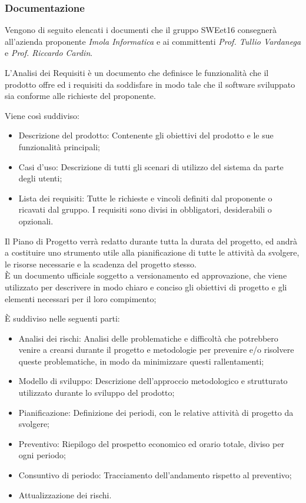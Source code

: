 \subsubsection{Documentazione}

Vengono di seguito elencati i documenti che il gruppo SWEet16 consegnerà all'azienda proponente \textit{Imola Informatica} e ai committenti \textit{Prof. Tullio Vardanega} e \textit{Prof. Riccardo Cardin}.



    L'Analisi dei Requisiti è un documento che definisce le funzionalità che il prodotto offre ed i requisiti da soddisfare in modo tale che il software sviluppato sia conforme alle richieste del proponente.

    Viene così suddiviso:
    \begin{itemize}
        \item Descrizione del prodotto: Contenente gli obiettivi del prodotto e le sue funzionalità principali;
        \item Casi d'uso: Descrizione di tutti gli scenari di utilizzo del sistema da parte degli utenti;
        \item Lista dei requisiti: Tutte le richieste e vincoli definiti dal proponente o ricavati dal gruppo. I requisiti sono divisi in obbligatori, desiderabili o opzionali.
    \end{itemize}




    Il Piano di Progetto verrà redatto durante tutta la durata del progetto, ed andrà a costituire uno strumento utile alla pianificazione di tutte le attività da svolgere, le risorse necessarie e la scadenza del progetto stesso. \\
    È un documento ufficiale soggetto a versionamento ed approvazione, che viene utilizzato per descrivere in modo chiaro e conciso gli obiettivi di progetto e gli elementi necessari per il loro compimento;

    È suddiviso nelle seguenti parti:
    \begin{itemize}
        \item Analisi dei rischi: Analisi delle problematiche e difficoltà che potrebbero venire a crearsi durante il progetto e metodologie per prevenire e/o risolvere queste problematiche, in modo da minimizzare questi rallentamenti;
        \item Modello di sviluppo: Descrizione dell'approccio metodologico e strutturato utilizzato durante lo sviluppo del prodotto;
        \item Pianificazione: Definizione dei periodi, con le relative attività di progetto da svolgere;
        \item Preventivo: Riepilogo del prospetto economico ed orario totale, diviso per ogni periodo;
        \item Consuntivo di periodo: Tracciamento dell’andamento rispetto al preventivo;
        \item Attualizzazione dei rischi.
    \end{itemize}

